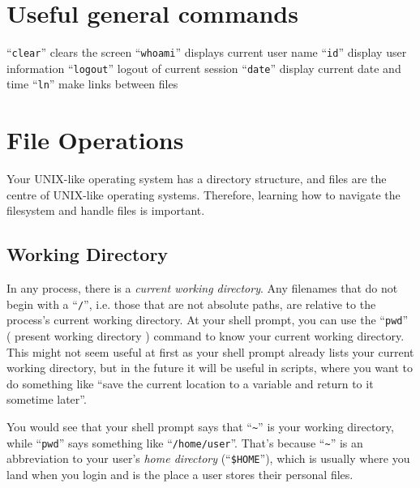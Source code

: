 \documentclass{extbook}
\begin{document}

\section{Useful general commands}
``\verb|clear|'' clears the screen
``\verb|whoami|'' displays current user name
``\verb|id|''  display user information
``\verb|logout|'' logout of current session
``\verb|date|'' display current date and time
``\verb|ln|'' make links between files

\section{File Operations}

Your UNIX-like operating system has a directory structure, and files are the centre of UNIX-like operating systems. Therefore, learning how to navigate the filesystem and handle files is important.

\subsection{Working Directory}

In any process, there is a \textit{current working directory}. Any filenames that do not begin with a ``\verb|/|'', i.e. those that are not absolute paths, are relative to the process's current working directory. At your shell prompt, you can use the ``\verb|pwd|'' ( present working directory ) command to know your current working directory. This might not seem useful at first as your shell prompt already lists your current working directory, but in the future it will be useful in scripts, where you want to do something like ``save the current location to a variable and return to it sometime later''.

You would see that your shell prompt says that ``\verb|~|'' is your working directory, while ``\verb|pwd|'' says something like ``\verb|/home/user|''. That's because ``\verb|~|'' is an abbreviation to your user's \textit{home directory} (``\verb|$HOME|''), which is usually where you land when you login and is the place a user stores their personal files.
\end{document}
